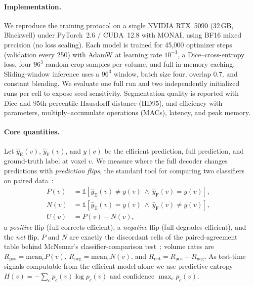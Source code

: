 \paragraph{Implementation.}
We reproduce the \method{} training protocol on a single NVIDIA RTX~5090 (32\,GB,
Blackwell) under PyTorch~2.6 / CUDA~12.8 with MONAI, using BF16 mixed precision
(no loss scaling).  Each model is trained for 45{,}000 optimizer steps
(validation every 250) with AdamW at learning rate $10^{-3}$, a
Dice--cross-entropy loss, four $96^3$ random-crop samples per volume, and full
in-memory caching.  Sliding-window inference uses a $96^3$ window, batch size four,
overlap 0.7, and constant blending.  We evaluate one full run and two independently
initialized \method{} runs per cell to expose seed sensitivity.  Segmentation
quality is reported with Dice and 95th-percentile Hausdorff distance (HD95), and
efficiency with parameters, multiply--accumulate operations (MACs), latency, and
peak memory.

\paragraph{Core quantities.}
Let $\hat{y}_{\mathrm{E}}(v)$, $\hat{y}_{\mathrm{F}}(v)$, and $y(v)$ be the
efficient prediction, full prediction, and ground-truth label at voxel $v$.  We
measure where the full decoder changes predictions with \emph{prediction flips},
the standard tool for comparing two classifiers on paired
data~\cite{yan2021pct,cormier2016churn}:
\begin{align}
P(v) &= \mathbb{1}\!\left[\hat{y}_{\mathrm{E}}(v)\neq y(v)\ \wedge\ \hat{y}_{\mathrm{F}}(v)=y(v)\right], \label{eq:pflip}\\
N(v) &= \mathbb{1}\!\left[\hat{y}_{\mathrm{E}}(v)=y(v)\ \wedge\ \hat{y}_{\mathrm{F}}(v)\neq y(v)\right], \label{eq:nflip}\\
U(v) &= P(v)-N(v), \label{eq:net}
\end{align}
a \emph{positive} flip (full corrects efficient), a \emph{negative} flip (full
degrades efficient), and the \emph{net} flip.  $P$ and $N$ are exactly the discordant
cells of the paired-agreement table behind McNemar's classifier-comparison
test~\cite{mcnemar1947,dietterich1998}; volume rates are
$R_{\mathrm{pos}}=\mathrm{mean}_v P(v)$, $R_{\mathrm{neg}}=\mathrm{mean}_v N(v)$, and
$R_{\mathrm{net}}=R_{\mathrm{pos}}-R_{\mathrm{neg}}$.  As test-time signals computable
from the efficient model alone we use predictive entropy
$H(v)=-\sum_{c} p_c(v)\log p_c(v)$ and confidence $\max_c p_c(v)$.

